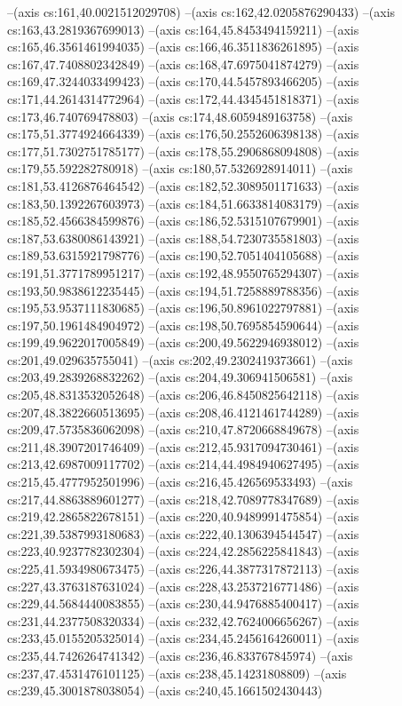 --(axis cs:161,40.0021512029708)
--(axis cs:162,42.0205876290433)
--(axis cs:163,43.2819367699013)
--(axis cs:164,45.8453494159211)
--(axis cs:165,46.3561461994035)
--(axis cs:166,46.3511836261895)
--(axis cs:167,47.7408802342849)
--(axis cs:168,47.6975041874279)
--(axis cs:169,47.3244033499423)
--(axis cs:170,44.5457893466205)
--(axis cs:171,44.2614314772964)
--(axis cs:172,44.4345451818371)
--(axis cs:173,46.740769478803)
--(axis cs:174,48.6059489163758)
--(axis cs:175,51.3774924664339)
--(axis cs:176,50.2552606398138)
--(axis cs:177,51.7302751785177)
--(axis cs:178,55.2906868094808)
--(axis cs:179,55.592282780918)
--(axis cs:180,57.5326928914011)
--(axis cs:181,53.4126876464542)
--(axis cs:182,52.3089501171633)
--(axis cs:183,50.1392267603973)
--(axis cs:184,51.6633814083179)
--(axis cs:185,52.4566384599876)
--(axis cs:186,52.5315107679901)
--(axis cs:187,53.6380086143921)
--(axis cs:188,54.7230735581803)
--(axis cs:189,53.6315921798776)
--(axis cs:190,52.7051404105688)
--(axis cs:191,51.3771789951217)
--(axis cs:192,48.9550765294307)
--(axis cs:193,50.9838612235445)
--(axis cs:194,51.7258889788356)
--(axis cs:195,53.9537111830685)
--(axis cs:196,50.8961022797881)
--(axis cs:197,50.1961484904972)
--(axis cs:198,50.7695854590644)
--(axis cs:199,49.9622017005849)
--(axis cs:200,49.5622946938012)
--(axis cs:201,49.029635755041)
--(axis cs:202,49.2302419373661)
--(axis cs:203,49.2839268832262)
--(axis cs:204,49.306941506581)
--(axis cs:205,48.8313532052648)
--(axis cs:206,46.8450825642118)
--(axis cs:207,48.3822660513695)
--(axis cs:208,46.4121461744289)
--(axis cs:209,47.5735836062098)
--(axis cs:210,47.8720668849678)
--(axis cs:211,48.3907201746409)
--(axis cs:212,45.9317094730461)
--(axis cs:213,42.6987009117702)
--(axis cs:214,44.4984940627495)
--(axis cs:215,45.4777952501996)
--(axis cs:216,45.426569533493)
--(axis cs:217,44.8863889601277)
--(axis cs:218,42.7089778347689)
--(axis cs:219,42.2865822678151)
--(axis cs:220,40.9489991475854)
--(axis cs:221,39.5387993180683)
--(axis cs:222,40.1306394544547)
--(axis cs:223,40.9237782302304)
--(axis cs:224,42.2856225841843)
--(axis cs:225,41.5934980673475)
--(axis cs:226,44.3877317872113)
--(axis cs:227,43.3763187631024)
--(axis cs:228,43.2537216771486)
--(axis cs:229,44.5684440083855)
--(axis cs:230,44.9476885400417)
--(axis cs:231,44.2377508320334)
--(axis cs:232,42.7624006656267)
--(axis cs:233,45.0155205325014)
--(axis cs:234,45.2456164260011)
--(axis cs:235,44.7426264741342)
--(axis cs:236,46.833767845974)
--(axis cs:237,47.4531476101125)
--(axis cs:238,45.14231808809)
--(axis cs:239,45.3001878038054)
--(axis cs:240,45.1661502430443)
